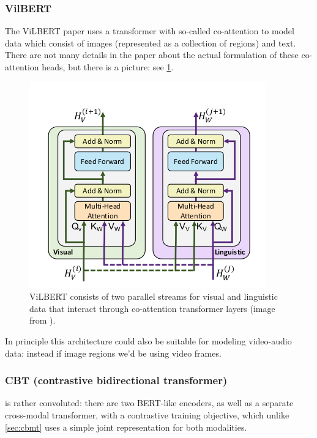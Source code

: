 \subsubsection{VilBERT}
The ViLBERT paper \citep{lu2019vilbert} uses a transformer with
so-called co-attention to model data which consist of images
(represented as a collection of regions) and text. There are not many
details in the paper about the actual formulation of these
co-attention heads, but there is a picture: see \cref{fig:coatt}.
\begin{figure}
  \centering
  \includegraphics[scale=0.3]{coatt.png}
  \caption{ViLBERT consists of two parallel streams for visual and
    linguistic data that interact through co-attention transformer
    layers (image from \citep{lu2019vilbert}).}
  \label{fig:coatt}
\end{figure}
In principle this architecture could also be suitable for modeling
video-audio data: instead if image regions we'd be using video frames.

\subsubsection{CBT (contrastive bidirectional transformer)}
\citet{sun2019learning} is rather convoluted: there are two BERT-like
encoders, as well as a separate cross-modal transformer, with a
contrastive training objective, which unlike \cref{sec:cbmt} uses a
simple joint representation for both modalities.



